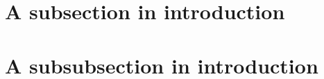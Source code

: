 \documentclass[../main.tex]{subfiles}
\begin{document}
\section{A subsection in introduction}

\section{A subsubsection in introduction}
\end{document}
